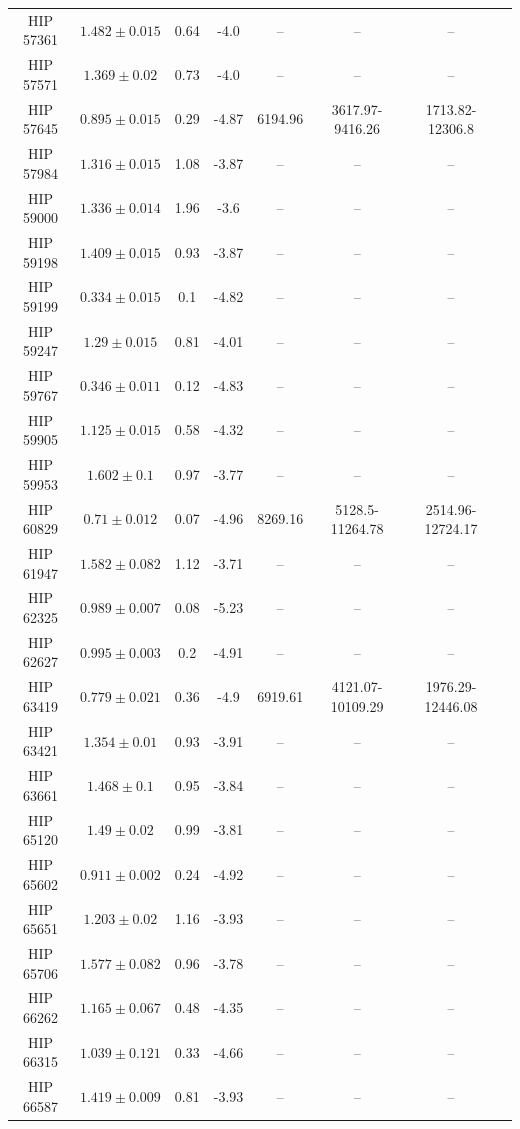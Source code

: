\begin{longtable}{|c|c|c|c|c|c|c|c|}
HIP 57361 & $ 1.482 \pm 0.015 $ & 0.64 & -4.0 &-- &-- &-- \\
HIP 57571 & $ 1.369 \pm 0.02 $ & 0.73 & -4.0 &-- &-- &-- \\
HIP 57645 & $ 0.895 \pm 0.015 $ & 0.29 & -4.87 & 6194.96 & 3617.97-9416.26 & 1713.82-12306.8 \\
HIP 57984 & $ 1.316 \pm 0.015 $ & 1.08 & -3.87 &-- &-- &-- \\
HIP 59000 & $ 1.336 \pm 0.014 $ & 1.96 & -3.6 &-- &-- &-- \\
HIP 59198 & $ 1.409 \pm 0.015 $ & 0.93 & -3.87 &-- &-- &-- \\
HIP 59199 & $ 0.334 \pm 0.015 $ & 0.1 & -4.82 &-- &-- &-- \\
HIP 59247 & $ 1.29 \pm 0.015 $ & 0.81 & -4.01 &-- &-- &-- \\
HIP 59767 & $ 0.346 \pm 0.011 $ & 0.12 & -4.83 &-- &-- &-- \\
HIP 59905 & $ 1.125 \pm 0.015 $ & 0.58 & -4.32 &-- &-- &-- \\
HIP 59953 & $ 1.602 \pm 0.1 $ & 0.97 & -3.77 &-- &-- &-- \\
HIP 60829 & $ 0.71 \pm 0.012 $ & 0.07 & -4.96 & 8269.16 & 5128.5-11264.78 & 2514.96-12724.17 \\
HIP 61947 & $ 1.582 \pm 0.082 $ & 1.12 & -3.71 &-- &-- &-- \\
HIP 62325 & $ 0.989 \pm 0.007 $ & 0.08 & -5.23 &-- &-- &-- \\
HIP 62627 & $ 0.995 \pm 0.003 $ & 0.2 & -4.91 &-- &-- &-- \\
HIP 63419 & $ 0.779 \pm 0.021 $ & 0.36 & -4.9 & 6919.61 & 4121.07-10109.29 & 1976.29-12446.08 \\
HIP 63421 & $ 1.354 \pm 0.01 $ & 0.93 & -3.91 &-- &-- &-- \\
HIP 63661 & $ 1.468 \pm 0.1 $ & 0.95 & -3.84 &-- &-- &-- \\
HIP 65120 & $ 1.49 \pm 0.02 $ & 0.99 & -3.81 &-- &-- &-- \\
HIP 65602 & $ 0.911 \pm 0.002 $ & 0.24 & -4.92 &-- &-- &-- \\
HIP 65651 & $ 1.203 \pm 0.02 $ & 1.16 & -3.93 &-- &-- &-- \\
HIP 65706 & $ 1.577 \pm 0.082 $ & 0.96 & -3.78 &-- &-- &-- \\
HIP 66262 & $ 1.165 \pm 0.067 $ & 0.48 & -4.35 &-- &-- &-- \\
HIP 66315 & $ 1.039 \pm 0.121 $ & 0.33 & -4.66 &-- &-- &-- \\
HIP 66587 & $ 1.419 \pm 0.009 $ & 0.81 & -3.93 &-- &-- &-- \\

\end{longtable}
